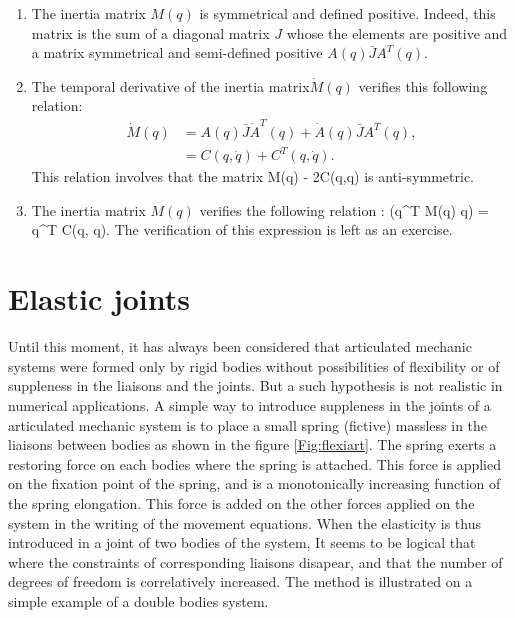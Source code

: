 \begin{enumerate}
\item The inertia matrix $M(q)$ is symmetrical and defined positive. Indeed, this matrix is the sum of a diagonal matrix $J$ whose the elements are positive and a matrix symmetrical and semi-defined positive $A(q)\bar{J}A^{T}(q)$.
\item The temporal derivative of the inertia matrix$\dot M(q)$ verifies this following relation:
\begin{equation*} \begin{split}
\dot M(q) &= A(q)\bar{J}\dot A^{T}(q) + \dot A(q)\bar{J}A^{T}(q),  \\
&= C(q,\dot q) + C^T(q,\dot q). \label{prop2}
\end{split} \end{equation*}
This relation involves that the matrix 
\eqn
\dot M(q) - 2C(q,\dot q) \label{prop1}
\eeqn
is anti-symmetric.
\item 	The inertia matrix $M(q)$ verifies the following relation :
\eqn
{}(\dot q^T M(q) \dot q) = \dot q^T C(q, \dot q). \label{prop2}
\eeqn
The verification of this expression is left as an exercise.
\end{enumerate}


\section{Elastic joints}

Until this moment, it has always been considered that articulated mechanic systems were formed only by rigid bodies without possibilities of flexibility or of suppleness in the liaisons and the joints. But a such hypothesis is not realistic in numerical applications. A simple way to introduce suppleness in the joints of a articulated mechanic system is to place a small spring (fictive) massless in the liaisons between bodies as shown in the figure \ref{Fig:flexiart}. The spring exerts a restoring force on each bodies where the spring is attached. This force is applied on the fixation point of the spring, and is a monotonically increasing function of the spring elongation. This force is added on the other forces applied on the system in the writing of the movement equations. When the elasticity is thus introduced in a joint of two bodies of the system, It seems to be logical that where the constraints of corresponding liaisons disapear, and that the number of degrees of freedom is correlatively increased. The method is illustrated on a simple example of a double bodies system. 

